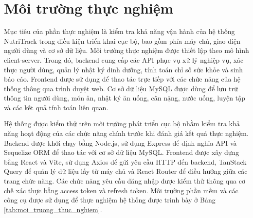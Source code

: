 \documentclass[12pt, a4paper]{report}
\begin{document}
\section{Môi trường thực nghiệm}Mục tiêu của phần thực nghiệm là kiểm tra khả năng vận hành của hệ thống NutriTrack trong điều kiện triển khai cục bộ, bao gồm phía máy chủ, giao diện người dùng và cơ sở dữ liệu. Môi trường thực nghiệm được thiết lập theo mô hình client-server. Trong đó, backend cung cấp các API phục vụ xử lý nghiệp vụ, xác thực người dùng, quản lý nhật ký dinh dưỡng, tính toán chỉ số sức khỏe và sinh báo cáo. Frontend được sử dụng để thao tác trực tiếp với các chức năng của hệ thống thông qua trình duyệt web. Cơ sở dữ liệu MySQL được dùng để lưu trữ thông tin người dùng, món ăn, nhật ký ăn uống, cân nặng, nước uống, luyện tập và các kết quả tính toán liên quan.

Hệ thống được kiểm thử trên môi trường phát triển cục bộ nhằm kiểm tra khả năng hoạt động của các chức năng chính trước khi đánh giá kết quả thực nghiệm. Backend được khởi chạy bằng Node.js, sử dụng Express để định nghĩa API và Sequelize ORM để thao tác với cơ sở dữ liệu MySQL. Frontend được xây dựng bằng React và Vite, sử dụng Axios để gửi yêu cầu HTTP đến backend, TanStack Query để quản lý dữ liệu lấy từ máy chủ và React Router để điều hướng giữa các trang chức năng. Các chức năng yêu cầu đăng nhập được kiểm thử thông qua cơ chế xác thực bằng access token và refresh token. Môi trường phần mềm và các công cụ được sử dụng để thực nghiệm hệ thống được trình bày ở Bảng \ref{tab:moi_truong_thuc_nghiem}.
\end{document}

